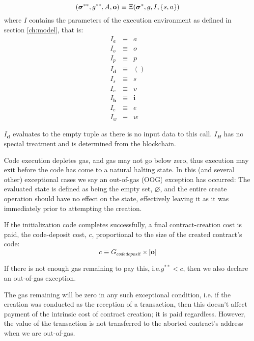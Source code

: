 \documentclass[9pt,oneside]{amsart}
\makeatletter
\newcommand*\ie{i.e.\@\xspace}
\makeatother
\begin{document}
\begin{multicols}{2}
\begin{equation}
(\boldsymbol{\sigma}^{**}, g^{**}, A, \mathbf{o}) \equiv \Xi(\boldsymbol{\sigma}^*, g, I, \{s, a\}) \\
\end{equation}
where $I$ contains the parameters of the execution environment as defined in section \ref{ch:model}, that is:
\begin{eqnarray}
I_a & \equiv & a \\
I_o & \equiv & o \\
I_p & \equiv & p \\
I_\mathbf{d} & \equiv & () \\
I_s & \equiv & s \\
I_v & \equiv & v \\
I_\mathbf{b} & \equiv & \mathbf{i} \\
I_e & \equiv & e \\
I_w & \equiv & w
\end{eqnarray}

$I_\mathbf{d}$ evaluates to the empty tuple as there is no input data to this call. $I_H$ has no special treatment and is determined from the blockchain.

Code execution depletes gas, and gas may not go below zero, thus execution may exit before the code has come to a natural halting state. In this (and several other) exceptional cases we say an out-of-gas (OOG) exception has occurred: The evaluated state is defined as being the empty set, $\varnothing$, and the entire create operation should have no effect on the state, effectively leaving it as it was immediately prior to attempting the creation.

If the initialization code completes successfully, a final contract-creation cost is paid, the code-deposit cost, $c$, proportional to the size of the created contract's code:
\begin{equation}
c \equiv G_{codedeposit} \times |\mathbf{o}|
\end{equation}

If there is not enough gas remaining to pay this, \ie $g^{**} < c$, then we also declare an out-of-gas exception.

The gas remaining will be zero in any such exceptional condition, \ie if the creation was conducted as the reception of a transaction, then this doesn't affect payment of the intrinsic cost of contract creation; it is paid regardless. However, the value of the transaction is not transferred to the aborted contract's address when we are out-of-gas.


\end{multicols}
\end{document}
